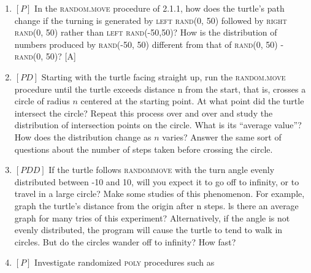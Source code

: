 \documentclass{book}
\begin{document}
\begin{enumerate}
\item $[P]$ In the \textsc{random.move} procedure of 2.1.1, how does the turtle's
path change if the turning is generated by \textsc{left rand(0, 50)} followed
by \textsc{right rand(0, 50)} rather than \textsc{left rand(-50,50)}? How is the
distribution of numbers produced by \textsc{rand(-50, 50)} different from that
of \textsc{rand(0, 50)} - \textsc{rand(0, 50)}? [A]
\item $[PD]$ Starting with the turtle facing straight up, run the \textsc{random.move}
procedure until the turtle exceeds distance n from the start, that is,
crosses a circle of radius $n$ centered at the starting point. At what point
did the turtle intersect the circle? Repeat this process over and over
and study the distribution of intersection points on the circle. What
is its ``average value''? How does the distribution change as $n$ varies?
Answer the same sort of questions about the number of steps taken
before crossing the circle.  
\item $[PDD]$ If the turtle follows \textsc{randommove} with the turn angle evenly 
distributed between -10 and 10, will you expect it to go off to infinity,
or to travel in a large circle? Make some studies of this phenomenon.
For example, graph the turtle's distance from the origin after n steps. ls
there an average graph for many tries of this experiment? Alternatively,
if the angle is not evenly distributed, the program will cause the turtle
to tend to walk in circles. But do the circles wander off to infinity? How
fast?
\item $[P]$ Investigate randomized \textsc{poly} procedures such as


\end{enumerate}
\end{document}
